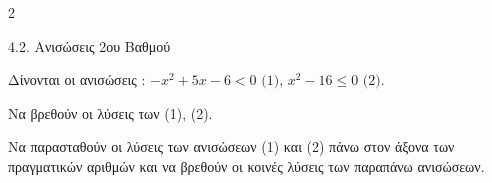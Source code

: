\begin{ylh}{2}
    \item 4.2. Ανισώσεις 2ου Βαθμού
\end{ylh}
Δίνονται οι ανισώσεις : $- x^{2} + 5x - 6 < 0\text{    (1),     }x^{2} - 16 \leq 0\text{    (2)}.$

\begin{alist}
\item Να βρεθούν οι λύσεις των (1), (2).
\item Να παρασταθούν οι λύσεις των ανισώσεων (1) και (2) πάνω στον άξονα των πραγματικών αριθμών και να βρεθούν οι κοινές λύσεις των παραπάνω ανισώσεων.
\end{alist}

